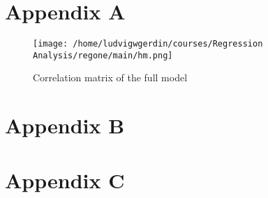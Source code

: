 \documentclass[11pt]{article}
\begin{document}
\section{Appendix A}
\label{sec:org30870c0}
\begin{figure}[htbp]
\centering
\texttt{[image: /home/ludvigwgerdin/courses/Regression Analysis/regone/main/hm.png]}
\caption{\label{fig:org2fb3c36}
Correlation matrix of the full model}
\end{figure}

\section{Appendix B}
\label{sec:orgc9f16e2}




\section{Appendix C}
\label{sec:org1bf4b38}


\end{document}
